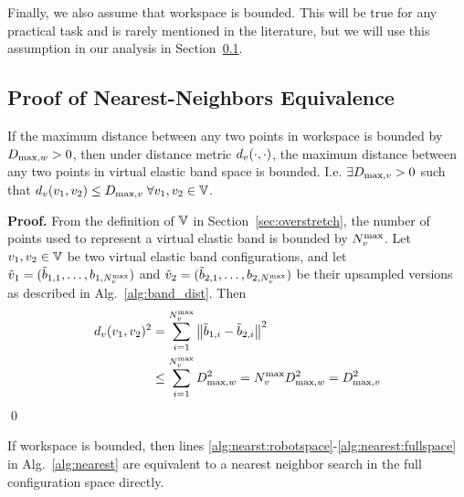 Finally, we also assume that workspace is bounded. This will be true for any practical task and is rarely mentioned in the literature, but we will use this assumption in our analysis in Section~\ref{sec:nn_equiv}.




\subsection{Proof of Nearest-Neighbors Equivalence}
\label{sec:nn_equiv}


\begin{lemma}
    \label{lem:banddist}
     If the maximum distance between any two points in workspace is bounded by $D_{\textrm{max}, w} > 0$, then under distance metric $d_v(\cdot, \cdot)$, the maximum distance between any two points in virtual elastic band space is bounded. I.e. $\exists D_{\textrm{max},v} > 0$ such that $d_v(v_1, v_2) \leq D_{\textrm{max},v} \; \forall v_1, v_2 \in \mathbb{V}$.
\end{lemma}


\noindent
{\bf Proof.}
From the definition of $\mathbb{V}$ in Section~\ref{sec:overstretch}, the number of points used to represent a virtual elastic band is bounded by $N_v^\textrm{max}$. Let $v_1, v_2 \in \mathbb{V}$ be two virtual elastic band configurations, and let $\tilde {v}_1 = (\tilde b_{1,1}, \dots, b_{1,N_v^\textrm{max}})$ and $\tilde {v}_2 = (\tilde b_{2,1}, \dots, b_{2,N_v^\textrm{max}})$ be their upsampled versions as described in Alg.~\ref{alg:band_dist}. Then
\begin{equation}
\begin{split}
    d_v(v_1, v_2)^2 &= \sum_{i=1}^{N_v^\textrm{max}} \left\| \tilde b_{1,i} - \tilde b_{2,i} \right\|^2 \\
                                &\leq \sum_{i=1}^{N_v^\textrm{max}} D_{\textrm{max}, w}^2 = N_v^\textrm{max} D_{\textrm{max}, w}^2 = D_{\textrm{max},v}^2
\end{split}
\end{equation}
\qed




\begin{lemma}
    If workspace is bounded, then lines \ref{alg:nearst:robotspace}-\ref{alg:nearest:fullspace} in Alg.~\ref{alg:nearest} are equivalent to a nearest neighbor search in the full configuration space directly.
\end{lemma}

